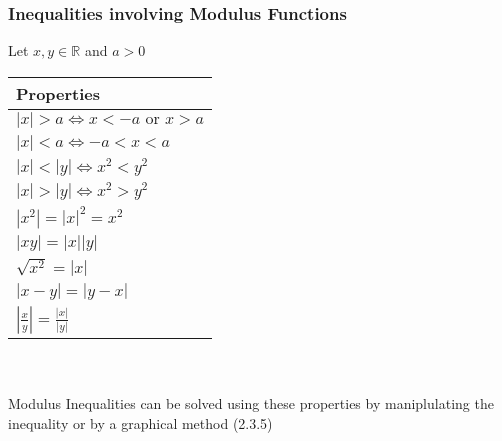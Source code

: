 \documentclass[../main.tex]{subfiles}
\begin{document}
\subsubsection{Inequalities involving Modulus Functions}
Let \(x,y \in \mathbb{R}\) and \(a>0\) \\
\begin{tabularx}{0.43\textwidth} {
    | >{\centering\arraybackslash}X |}
    \hline
    \textbf{Properties} \\
    \hline
    \(|x|>a \iff x<-a \text{ or } x>a\) \\
    \(|x|<a \iff -a<x<a\) \\
    \hline
    \(|x|<|y| \iff x^{2}<y^{2}\) \\
    \(|x|>|y| \iff x^{2}>y^{2}\) \\
    \hline
    \(|x^{2}|=|x|^{2}=x^{2}\) \\
    \(|xy|=|x||y|\) \\
    \(\sqrt{x^{2}}=|x|\) \\
    \hline
    \(|x-y|=|y-x|\) \\
    \hline
    \(\displaystyle \left|\frac{x}{y}\right| = \frac{|x|}{|y|}\) \\
    \hline
\end{tabularx} \\\\
Modulus Inequalities can be solved using these properties by
maniplulating the inequality or by a graphical method (2.3.5)
\newpage \noindent
\end{document}

